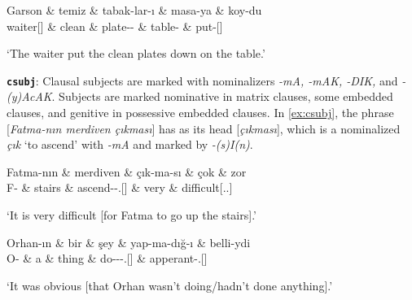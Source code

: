 \documentclass[11pt,a4paper]{article}
\begin{document}
\begin{exe}
\ex \label{iobj}
\begin{dependency}
\begin{deptext}[column sep=0.3cm]
Garson \& temiz \& tabak-lar-ı \& masa-ya \& koy-du \\
waiter[{\Nom}] \& clean \& plate-\Pl{}-\Acc{} \& table-\Dat{} \& put-\Pst{}[\Tsg] \\
\end{deptext}
\end{dependency}
\glt `The waiter put the clean plates down on the table.'
\end{exe}


\textbf{\texttt{csubj}}:
Clausal subjects are marked with nominalizers  \textit{-mA, -mAK, -DIK,} and \textit{-(y)AcAK}. Subjects are marked nominative in matrix clauses, some embedded clauses, and genitive in possessive embedded clauses. In \autoref{ex:csubj}, the phrase [\textit{Fatma-nın merdiven çıkması}] has as its head [\textit{çıkması}], which is a nominalized \textit{çık} `to ascend' with \textit{-mA} and marked by \textit{-(s)I(n)}.

\begin{exe}
\ex \label{ex:csubj}
\begin{dependency}
\begin{deptext}[column sep=0.3cm]
Fatma-nın \& merdiven \& çık-ma-sı \& çok \& zor \\
F-\Gen{} \& stairs \& ascend-\Nmlz{}-\Poss{}.\Tsg{}[\Nom] \& very \& difficult[\Cop.\Prs.\Tsg] \\
\end{deptext}
\end{dependency}
\glt `It is very difficult [for Fatma to go up the stairs].'

\ex \label{ex:csubj2}
\begin{dependency}
\begin{deptext}[column sep=0.24cm]
Orhan-ın \& bir \& şey \& yap-ma-dığ-ı \& belli-ydi \\
O-\Gen{} \& a \& thing \& do-\Neg{}-\Nmlz{}-\Poss{}.\Tsg{}[\Nom] \& apperant-{\Cop.\Pst}[\Tsg] \\
\end{deptext}
\end{dependency}
\glt `It was obvious [that Orhan wasn’t doing/hadn’t done anything].'
\end{exe}
\end{document}
